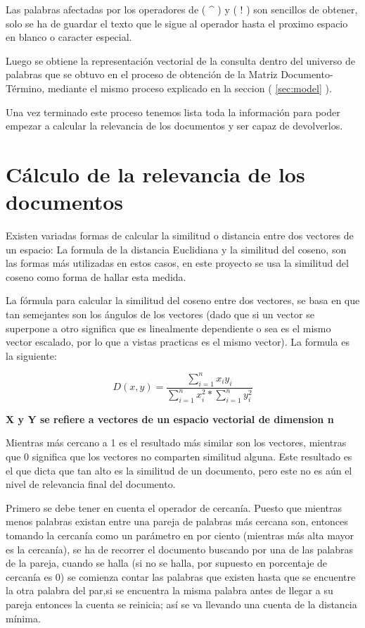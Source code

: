 \documentclass[10pt]{article}
\begin{document}
Las palabras afectadas por los operadores de ( \textasciicircum{} ) y ( ! )  son sencillos de obtener, solo se ha de guardar el texto que le sigue al operador hasta el proximo espacio en blanco o caracter especial.

Luego se obtiene la representación vectorial de la consulta dentro del universo de palabras que se obtuvo en el proceso de obtención de la Matriz Documento-Término, mediante el mismo proceso explicado en la seccion ( \ref{sec:model} ).

Una vez terminado este proceso tenemos lista toda la información para poder empezar a calcular la relevancia de los documentos y ser capaz de devolverlos.

\section{Cálculo de la relevancia de los documentos}
\label{sec:doc-relevancy}

Existen variadas formas de calcular la similitud o distancia entre dos vectores de un espacio: La formula de la distancia Euclidiana y la similitud del coseno, son las formas más utilizadas en estos casos, en este proyecto se usa la similitud del coseno como forma de hallar esta medida.

La fórmula para calcular la similitud del coseno entre dos vectores, se basa en que tan semejantes son los ángulos de los vectores (dado que si un vector se superpone a otro significa que es linealmente dependiente o sea es el mismo vector escalado, por lo que a vistas practicas es el mismo vector). La formula es la siguiente:

\huge \begin{equation*}
	D(x,y) = \frac{\sum_{i=1}^{n} x_{i} y_{i} }{ \sum_{i=1}^{n} x_{i}^2 * \sum_{i=1}^{n} y_{i}^2 }
\end{equation*} \normalsize

\begin{center}
	\bfseries  X y Y se refiere a vectores de un espacio vectorial de dimension n
\end{center}

Mientras más cercano a 1 es el resultado más similar son los vectores, mientras que 0 significa que los vectores no comparten similitud alguna. Este resultado es el que dicta que tan alto es la similitud de un documento, pero este no es aún el nivel de relevancia final del documento. 

Primero se debe tener en cuenta el operador de cercanía. Puesto que mientras menos palabras existan entre una pareja de palabras más cercana son, entonces tomando la cercanía como un parámetro en por ciento (mientras más alta mayor es la cercanía), se ha de recorrer el documento buscando por una de las palabras de la pareja, cuando se halla (si no se halla, por supuesto en porcentaje de cercanía es 0) se comienza contar las palabras que existen hasta que se encuentre la otra palabra del par,si se encuentra la misma palabra antes de llegar a su pareja entonces la cuenta se reinicia; así se va llevando una cuenta de la distancia mínima. 
\end{document}
